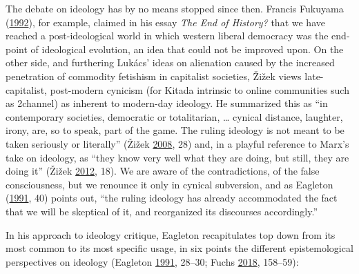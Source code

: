 \documentclass[10pt,british,A4paper,twoside]{memoir}
\begin{document}
The debate on ideology has by no means stopped since then. Francis
Fukuyama (\protect\hyperlink{ref-fukuyama_end_1992}{1992}), for example,
claimed in his essay \emph{The End of History?} that we have reached a
post-ideological world in which western liberal democracy was the
end-point of ideological evolution, an idea that could not be improved
upon. On the other side, and furthering Lukács' ideas on alienation
caused by the increased penetration of commodity fetishism in capitalist
societies, Žižek views late-capitalist, post-modern cynicism (for Kitada
intrinsic to online communities such as 2channel) as inherent to
modern-day ideology. He summarized this as ``in contemporary societies,
democratic or totalitarian, \ldots{} cynical distance, laughter, irony,
are, so to speak, part of the game. The ruling ideology is not meant to
be taken seriously or literally'' (Žižek
\protect\hyperlink{ref-zizek_sublime_2008}{2008}, 28) and, in a playful
reference to Marx's take on ideology, as ``they know very well what they
are doing, but still, they are doing it'' (Žižek
\protect\hyperlink{ref-zizek_mapping_2012}{2012}, 18). We are aware of
the contradictions, of the false consciousness, but we renounce it only
in cynical subversion, and as Eagleton
(\protect\hyperlink{ref-eagleton_ideology:_1991}{1991}, 40) points out,
``the ruling ideology has already accommodated the fact that we will be
skeptical of it, and reorganized its discourses accordingly.''

In his approach to ideology critique, Eagleton recapitulates top down
from its most common to its most specific usage, in six points the
different epistemological perspectives on ideology (Eagleton
\protect\hyperlink{ref-eagleton_ideology:_1991}{1991}, 28--30; Fuchs
\protect\hyperlink{ref-fuchs_racism_2018}{2018}, 158--59):
\end{document}
